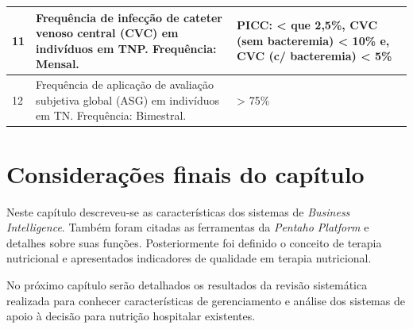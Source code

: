 \begin{quadro}[htb]
\begin{tabular}{|p{1cm}|p{9cm}|p{5cm}|}
    11 & Frequência de infecção de cateter venoso central (CVC) em indivíduos em
TNP. \newline Frequência: Mensal. & PICC: < que 2,5\%, CVC (sem bacteremia) < 10\% e, CVC (c/ bacteremia) < 5\% \\ \hline
    12 & Frequência de aplicação de avaliação subjetiva global (ASG) em indivíduos em
TN. \newline Frequência: Bimestral. & > 75\% \\ \hline
\end{tabular}
\end{quadro}

\section{Considerações finais do capítulo}
Neste capítulo descreveu-se as características dos sistemas de \textit{Business Intelligence}. Também foram citadas as ferramentas da \textit{Pentaho Platform} e detalhes sobre suas funções. Posteriormente foi definido o conceito de terapia nutricional e apresentados indicadores de qualidade em terapia nutricional.

No próximo capítulo serão detalhados os resultados da revisão sistemática realizada para conhecer características de gerenciamento e análise dos sistemas de apoio à decisão para nutrição hospitalar existentes.